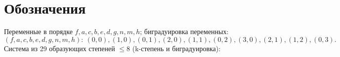 %

\section*{Обозначения}

Переменные в порядке $f,a,c,b,e,d,g,n,m,h$; биградуировка переменных:
\[
(f,a,c,b,e,d,g,n,m,h)\colon\ (0,0),(1,0),(0,1),(2,0),(1,1),(0,2),(3,0),(2,1),(1,2),(0,3).
\]
Система из 29 образующих степеней \(\leq\)8 (k-степень и биградуировка):

